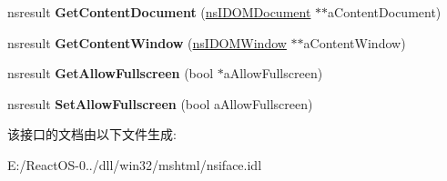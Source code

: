 \begin{DoxyCompactItemize}
nsresult {\bfseries Get\+Content\+Document} (\hyperlink{interfacens_i_d_o_m_document}{ns\+I\+D\+O\+M\+Document} $\ast$$\ast$a\+Content\+Document)
\item 
\mbox{\label{interfacens_i_d_o_m_h_t_m_l_i_frame_element_aab1afc3eae401f0e738b3bea6c2d004e}} 
nsresult {\bfseries Get\+Content\+Window} (\hyperlink{interfacens_i_d_o_m_window}{ns\+I\+D\+O\+M\+Window} $\ast$$\ast$a\+Content\+Window)
\item 
\mbox{\label{interfacens_i_d_o_m_h_t_m_l_i_frame_element_a8322d78464a93cd166a99913167f6887}} 
nsresult {\bfseries Get\+Allow\+Fullscreen} (bool $\ast$a\+Allow\+Fullscreen)
\item 
\mbox{\label{interfacens_i_d_o_m_h_t_m_l_i_frame_element_a7386bda83b2194d971c0dd4551385c9a}} 
nsresult {\bfseries Set\+Allow\+Fullscreen} (bool a\+Allow\+Fullscreen)
\end{DoxyCompactItemize}


该接口的文档由以下文件生成\+:\begin{DoxyCompactItemize}
\item 
E\+:/\+React\+O\+S-\/0../dll/win32/mshtml/nsiface.\+idl\end{DoxyCompactItemize}
